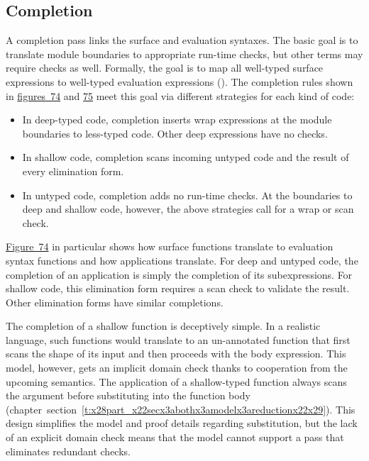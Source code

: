 \documentclass[ twoside,open=right,titlepage,numbers=noenddot,headinclude,%
                footinclude=true,cleardoublepage=empty,abstract=off,
                BCOR=5mm,paper=a4,fontsize=11pt,%
                ngerman,american,%
                parts,pdfspacing]{scrreprt}
\newcommand{\SecRef}[2]{section~#1}
\newcommand{\SecRefLocal}[3]{\hyperref[#1]{\SecRef{#2}{#3}}}
\newlength{\stabLeft}
\newcommand{\atItemizeStart}[0]{\addtolength{\stabLeft}{\labelsep}
                                \addtolength{\stabLeft}{\labelwidth}}
\newcommand{\Ssubsubsection}[2]{\subsubsection[#1]{#2}}
\newcommand{\FigureRef}[2]{#1}
\renewcommand{\Ssubsubsection}[2]{\subsection[#1]{#2}}
\renewcommand{\SecRefLocal}[3]{section~\ref{#1}}
\begin{document}
\Ssubsubsection{Completion}{Completion}\label{t:x28part_x22secx3abothx3amodelx3acompletionx22x29}

A completion pass links the surface and evaluation syntaxes.
The basic goal is to translate module boundaries to appropriate run{-}time
 checks, but other terms may require checks as well.
Formally, the goal is to map all well{-}typed surface expressions to well{-}typed
 evaluation expressions ().
The completion rules shown in \hyperref[t:x28counter_x28x22figurex22_x22figx3abothx3acompletion1x22x29x29]{figures~\FigureRef{74}{t:x28counter_x28x22figurex22_x22figx3abothx3acompletion1x22x29x29}} and \hyperref[t:x28counter_x28x22figurex22_x22figx3abothx3acompletion2x22x29x29]{\FigureRef{75}{t:x28counter_x28x22figurex22_x22figx3abothx3acompletion2x22x29x29}}
 meet this goal via different strategies for each kind of code:


\noindent \begin{itemize}\atItemizeStart

\item In deep{-}typed code, completion inserts wrap expressions at the
 module boundaries to less{-}typed code.
Other deep expressions have no checks.

\item In shallow code, completion scans incoming untyped code and the result
 of every elimination form.

\item In untyped code, completion adds no run{-}time checks.
At the boundaries to deep and shallow code, however, the above
 strategies call for a wrap or scan check.\end{itemize}

\noindent \noindent{}\hyperref[t:x28counter_x28x22figurex22_x22figx3abothx3acompletion1x22x29x29]{Figure~\FigureRef{74}{t:x28counter_x28x22figurex22_x22figx3abothx3acompletion1x22x29x29}} in particular shows how surface
 functions translate to evaluation syntax functions and how applications translate.
For deep and untyped code, the completion of an application is simply
 the completion of its subexpressions.
For shallow code, this elimination form requires a scan check to
 validate the result.
Other elimination forms have similar completions.

The completion of a shallow function is deceptively simple.
In a realistic language, such functions would translate to an un{-}annotated
 function that first scans the shape of its input and then proceeds with the
 body expression.
This model, however, gets an implicit domain check thanks to cooperation
 from the upcoming semantics.
The application of a shallow{-}typed function always scans the
 argument before substituting into the function body (chapter~\SecRefLocal{t:x28part_x22secx3abothx3amodelx3areductionx22x29}{6.1.6}{Reduction Relation}).
This design simplifies the model and proof details regarding substitution,
 but the lack of an explicit domain check means that the model cannot
 support a pass that eliminates redundant checks.
\end{document}
